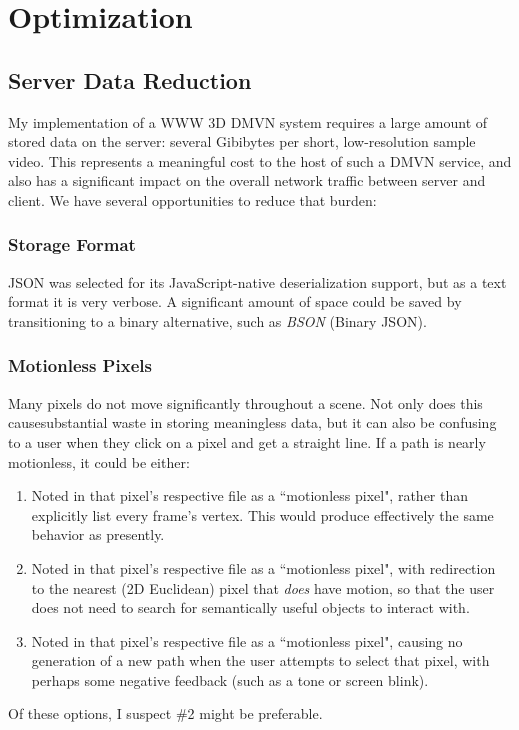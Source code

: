 \section{Optimization}

\subsection{Server Data Reduction}
    My implementation of a WWW 3D DMVN system requires a large amount of stored data on the server: several Gibibytes per short, low-resolution sample video. This represents a meaningful cost to the host of such a DMVN service, and also has a significant impact on the overall network traffic between server and client. We have several opportunities to reduce that burden:

\subsubsection{Storage Format}
JSON was selected for its JavaScript-native deserialization support, but as a text format it is very verbose. A significant amount of space could be saved by transitioning to a binary alternative, such as \emph{BSON} (Binary JSON).

\subsubsection{Motionless Pixels}
    Many pixels do not move significantly throughout a scene. Not only does this causesubstantial waste in storing meaningless data, but it can also be confusing to a user when they click on a pixel and get a straight line. If a path is nearly motionless, it could be either:
    \begin{enumerate}
        \item Noted in that pixel's respective file as a ``motionless pixel", rather than explicitly list every frame's vertex. This would produce effectively the same behavior as presently.
        \item Noted in that pixel's respective file as a ``motionless pixel", with redirection to the nearest (2D Euclidean) pixel that \emph{does} have motion, so that the user does not need to search for semantically useful objects to interact with.
        \item Noted in that pixel's respective file as a ``motionless pixel", causing no generation of a new path when the user attempts to select that pixel, with perhaps some negative feedback (such as a tone or screen blink).
    \end{enumerate}
    Of these options, I suspect \#2 might be preferable.

